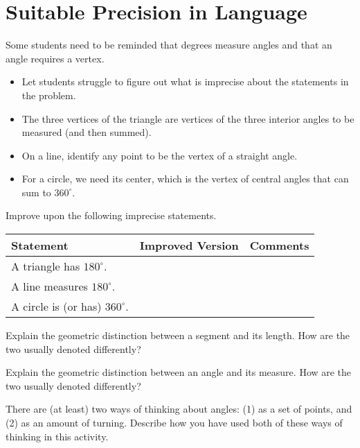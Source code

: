 \newpage
\section{Suitable Precision in Language}

\begin{teachingnote}
Some students need to be reminded that degrees measure angles and that an angle requires a vertex. 
\begin{itemize}
\itemsep0em
\item Let students struggle to figure out what is imprecise about the statements in the problem.  
\item The three vertices of the triangle are vertices of the three interior angles to be measured (and then summed).  
\item On a line, identify any point to be the vertex of a straight angle.  
\item For a circle, we need its center, which is the vertex of central angles 
that can sum to $360^\circ$.  
\end{itemize}
\end{teachingnote}

\begin{prob}
Improve upon the following imprecise statements. 

{\renewcommand{\arraystretch}{1.5}
\begin{tabular}{|>{\centering\arraybackslash}m{4cm}|>{\centering\arraybackslash}m{9.5cm}|>{\centering\arraybackslash}m{4cm}|}\hline
Statement & Improved Version & Comments \\\hline

\rule{0pt}{1cm}A triangle has $180^\circ$. & & \\ \hline

\rule{0pt}{1cm}A line measures $180^\circ$. & & \\ \hline

\rule{0pt}{1cm}A circle is (or has) $360^\circ$. & & \\ \hline
 \hline
\end{tabular}}
\end{prob}

\begin{prob}
Explain the geometric distinction between a segment and its length.  How are the two usually denoted differently?  
\end{prob}
\vspace{.8in}

\begin{prob}
Explain the geometric distinction between an angle and its measure.  How are the two usually denoted differently?  
\end{prob}
\vspace{.8in}
\begin{prob}
There are (at least) two ways of thinking about angles:  (1) as a set of points, and (2) as an amount of turning.  
Describe how you have used both of these ways of thinking in this activity.  
\end{prob}

